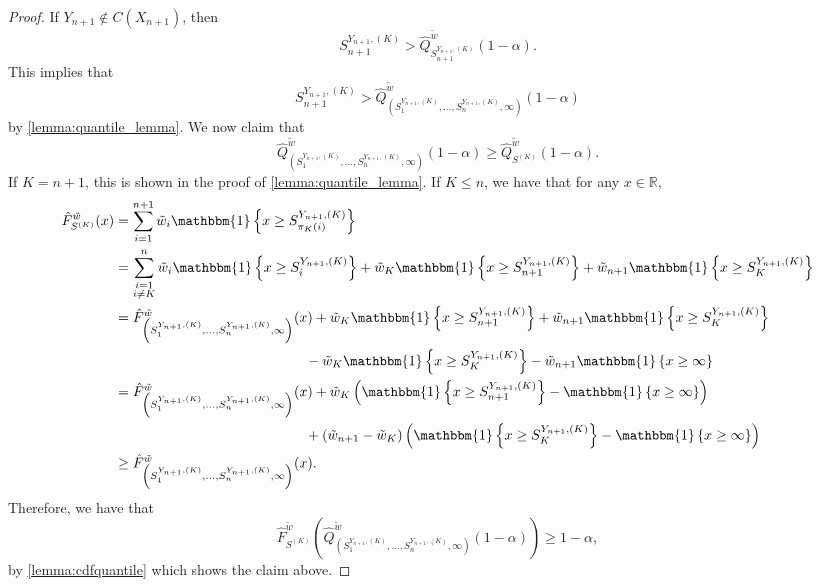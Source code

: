 \documentclass[11pt, titlepage]{article} %
\newcommand{\Ind}[1]{\mathbbm{1}\left\{ #1 \right\}}
\numberwithin{equation}{section}
\theoremstyle{definition}
\numberwithin{theorem}{section}
\numberwithin{lemma}{section}
\numberwithin{corollary}{section}
\numberwithin{proposition}{section}
\numberwithin{definition}{section}
\numberwithin{remark}{section}
\begin{document}
\begin{proof}
    If \(Y_{n+1} \not \in C(X_{n+1})\), then \[S_{n+1}^{Y_{n+1}, (K)} > \hat{Q}^{\tilde{w}}_{S_{n+1}^{Y_{n+1}, (K)}}(1-\alpha).\] This implies that \[S_{n+1}^{Y_{n+1}, (K)} > \hat{Q}^{\tilde{w}}_{\left( S_1^{Y_{n+1}, (K)}, \ldots, S_n^{Y_{n+1}, (K)}, \infty  \right)}(1-\alpha)\] by \cref{lemma:quantile_lemma}. We now claim that \[\hat{Q}^{\tilde{w}}_{\left( S_1^{Y_{n+1}, (K)}, \ldots, S_n^{Y_{n+1}, (K)}, \infty  \right)}(1-\alpha) \geq \hat{Q}^{\tilde{w}}_{S^{(K)}}(1-\alpha).\] If \(K = n+1\), this is shown in the proof of \cref{lemma:quantile_lemma}. If \(K \leq n\), we have that for any \(x \in \mathbb{R}\), \begin{align*}
        \hat{F}^{\tilde{w}}_{S^{(K)}}(x) &= \sum_{i=1}^{n+1} \tilde{w}_i \Ind{x \geq S_{\pi_K(i)}^{Y_{n+1}, (K)}} \\
        &= \sum_{\substack{i = 1 \\ i \neq K}}^{n} \tilde{w}_i \Ind{x \geq S_i^{Y_{n+1}, (K)}} + \tilde{w}_K \Ind{x \geq S_{n+1}^{Y_{n+1}, (K)}} + \tilde{w}_{n+1} \Ind{x \geq S_K^{Y_{n+1}, (K)}} \\
        &= \hat{F}^{\tilde{w}}_{\left( S_1^{Y_{n+1}, (K)}, \ldots, S_n^{Y_{n+1}, (K)}, \infty  \right)}(x) + \tilde{w}_K \Ind{x \geq S_{n+1}^{Y_{n+1}, (K)}} + \tilde{w}_{n+1} \Ind{x \geq S_K^{Y_{n+1}, (K)}} \\
        & \hspace{4.8cm} -  \tilde{w}_K \Ind{x \geq S_{K}^{Y_{n+1}, (K)}} - \tilde{w}_{n+1} \Ind{x \geq \infty} \\
        &= \hat{F}^{\tilde{w}}_{\left( S_1^{Y_{n+1}, (K)}, \ldots, S_n^{Y_{n+1}, (K)}, \infty  \right)}(x) + \tilde{w}_K \left (\Ind{x \geq S_{n+1}^{Y_{n+1}, (K)}} - \Ind{x \geq \infty} \right) \\
        & \hspace{4.8cm} + \left( \tilde{w}_{n+1} - \tilde{w}_K\right) \left(\Ind{x \geq S_{K}^{Y_{n+1}, (K)}} - \Ind{x \geq \infty} \right) \\
        & \geq \hat{F}^{\tilde{w}}_{\left( S_1^{Y_{n+1}, (K)}, \ldots, S_n^{Y_{n+1}, (K)}, \infty  \right)}(x).
    \end{align*}
    Therefore, we have that \[\hat{F}^{\tilde{w}}_{S^{(K)}}\left( \hat{Q}^{\tilde{w}}_{\left( S_1^{Y_{n+1}, (K)}, \ldots, S_n^{Y_{n+1}, (K)}, \infty  \right)}(1-\alpha) \right) \geq 1-\alpha,\] by \cref{lemma:cdfquantile} which shows the claim above. \vskip5pt


\end{proof}
\end{document}

